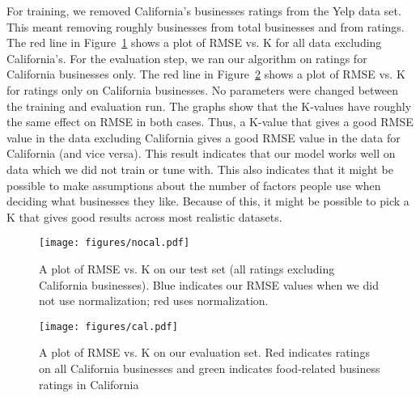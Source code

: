 For training, we removed California's businesses ratings from the Yelp data
set. This meant removing roughly \numBusCA businesses from \numBusTotal total
businesses and \numRatingCA from \numRatingTotal ratings.
The red line in Figure~\ref{fig:nocal} shows a plot of RMSE vs. K for all data excluding
California's. For the evaluation step, we ran our algorithm on ratings for
California businesses only. The red line in Figure~\ref{fig:cal} shows a plot of RMSE vs. K for
ratings only on California businesses. No parameters were changed between the
training and evaluation run. The graphs show that the K-values have roughly the
same effect on RMSE in both cases. Thus, a K-value that gives a good RMSE value
in the data excluding California gives a good RMSE value in the data for
California (and vice versa). This result indicates that our model works well on
data which we did not train or tune with. This also indicates that it might be
possible to make assumptions about the number of factors people use when
deciding what businesses they like. Because of this, it might be possible to
pick a K that gives good results across most realistic datasets.

\begin{figure}[ht!]
	\centering
	\texttt{[image: figures/nocal.pdf]}
	\caption[]{A plot of RMSE vs. K on our test set (all ratings excluding California businesses). Blue indicates our RMSE values when we did not use normalization; red uses normalization.}
	\label{fig:nocal}
\end{figure}


\begin{figure}[ht!]
	\centering
	\texttt{[image: figures/cal.pdf]}
	\caption[]{A plot of RMSE vs. K on our evaluation set. Red indicates ratings on all California businesses and green indicates food-related business ratings in California}
	\label{fig:cal}
\end{figure}




